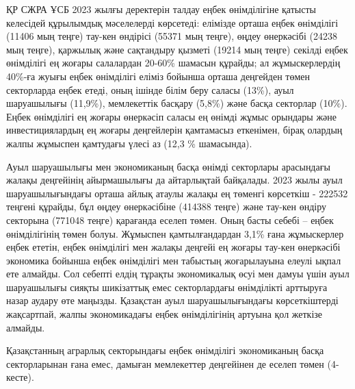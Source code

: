 \begin{multicols}{2}
ҚР СЖРА ҰСБ 2023 жылғы деректерін талдау еңбек өнімділігіне қатысты
келесідей құрылымдық мәселелерді көрсетеді: елімізде орташа еңбек
өнімділігі (11406 мың теңге) тау-кен өндірісі (55371 мың теңге), өңдеу
өнеркәсібі (24238 мың теңге), қаржылық және сақтандыру қызметі (19214
мың теңге) секілді еңбек өнімділігі ең жоғары салалардан 20-60\% шамасын
құрайды; ал жұмыскерлердің 40\%-ға жуығы еңбек өнімділігі еліміз бойынша
орташа деңгейден төмен секторларда еңбек етеді, оның ішінде білім беру
саласы (13\%), ауыл шаруашылығы (11,9\%), мемлекеттік басқару (5,8\%)
және басқа секторлар (10\%). Еңбек өнімділігі ең жоғары өнеркәсіп саласы
ең өнімді жұмыс орындары және инвестициялардың ең жоғары деңгейлерін
қамтамасыз еткенімен, бірақ олардың жалпы жұмыспен қамтудағы үлесі аз
(12,3 \% шамасында).

Ауыл шаруашылығы мен экономиканың басқа өнімді секторлары арасындағы
жалақы деңгейінің айырмашылығы да айтарлықтай байқалады. 2023 жылы ауыл
шаруашылығындағы орташа айлық атаулы жалақы ең төменгі көрсеткіш -
222532 теңгені құрайды, бұл өңдеу өнеркәсібіне (414388 теңге) және
тау-кен өндіру секторына (771048 теңге) қарағанда еселеп төмен. Оның
басты себебі -- еңбек өнімділігінің төмен болуы. Жұмыспен
қамтылғандардан 3,1\% ғана жұмыскерлер еңбек ететін, еңбек өнімділігі
мен жалақы деңгейі ең жоғары тау-кен өнеркәсібі экономика бойынша еңбек
өнімділігі мен табыстың жоғарылауына елеулі ықпал ете алмайды. Сол
себепті елдің тұрақты экономикалық өсуі мен дамуы үшін ауыл шаруашылығы
сияқты шикізаттық емес секторлардағы өнімділікті арттыруға назар аудару
өте маңызды. Қазақстан ауыл шаруашылығындағы көрсеткіштерді жақсартпай,
жалпы экономикадағы еңбек өнімділігінің артуына қол жеткізе алмайды.

Қазақстанның аграрлық секторындағы еңбек өнімділігі экономиканың басқа
секторларынан ғана емес, дамыған мемлекеттер деңгейінен де еселеп төмен
(4-кесте).
\end{multicols}

